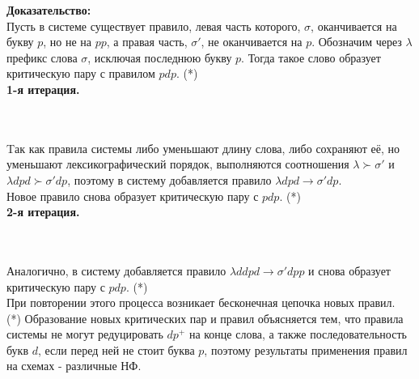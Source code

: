 \documentclass[a4paper,12pt]{article}
\begin{document}
\noindent\textbf{Доказательство:} \\

Пусть в системе существует правило, левая часть которого, $\sigma$, оканчивается на букву $p$, но не на $pp$, а правая часть, $\sigma'$, не оканчивается на $p$. Обозначим через $\lambda$ префикс слова $\sigma$, исключая последнюю букву $p$. Тогда такое слово образует критическую пару с правилом $pdp$. \hfill(*) \\

\noindent\textbf{1-я итерация.}  \\

  \\\\

Tак как правила системы либо уменьшают длину слова, либо сохраняют её, но уменьшают лексикографический порядок, выполняются соотношения $\lambda \succ \sigma'$ и $\lambda dpd \succ \sigma' dp$, поэтому в систему добавляется правило $\lambda dpd \rightarrow \sigma' dp$. \\

Новое правило снова образует критическую пару с $pdp$. \hfill(*) \\

\noindent\textbf{2-я итерация.}  \\

  \\\\

Аналогично, в систему добавляется правило $\lambda ddpd \rightarrow \sigma' dpp$ и снова образует критическую пару с $pdp$. \hfill(*) \\

При повторении этого процесса возникает бесконечная цепочка новых правил. \\

(*) Образование новых критических пар и правил объясняется тем, что правила системы не могут редуцировать $dp^{+}$ на конце слова, а также последовательность букв $d$, если перед ней не стоит буква $p$, поэтому результаты применения правил на схемах - различные НФ. \\ 
\end{document}
